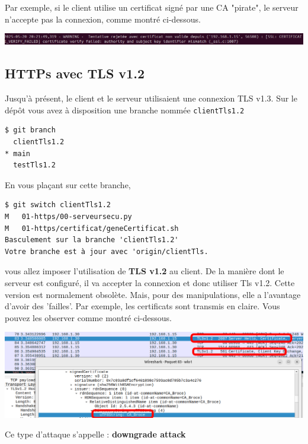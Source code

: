 \documentclass[french, 12pt]{article}%
\begin{document}
Par exemple, si le client utilise un certificat signé par une CA "pirate", le serveur n'accepte pas la connexion, comme montré ci-dessous.

\begin{center}
\includegraphics[scale=0.5]{./ressource/certPirate}
\end{center}

\subsection{HTTPs avec TLS v1.2}

Jusqu'à présent, le client et le serveur utilisaient une connexion TLS v1.3. Sur le dépôt vous avez à disposition une branche nommée \verb?clientTls1.2?

\begin{lstlisting}[style=commande]
$ git branch 
  clientTls1.2
* main
  testTls1.2
\end{lstlisting}

En vous plaçant sur cette branche,
\begin{lstlisting}[style=commande]
$ git switch clientTls1.2 
M	01-https/00-serveursecu.py
M	01-https/certificat/geneCertificat.sh
Basculement sur la branche 'clientTls1.2'
Votre branche est à jour avec 'origin/clientTls.
\end{lstlisting}
vous allez imposer l'utilisation de \textbf{TLS v1.2} au client. De la manière dont le serveur est configuré, il va accepter la connexion et donc utiliser Tls v1.2. Cette version est normalement obsolète. Mais, pour des manipulations, elle a l'avantage d'avoir des 'failles'. Par exemple, les certificats sont transmis en claire. 
Vous pouvez les observer comme montré ci-dessous.

\begin{center}
\includegraphics[scale=0.6	]{./ressource/tls1-2_Cert}
\end{center}

Ce type d'attaque s'appelle : \textbf{downgrade attack}
\end{document}
